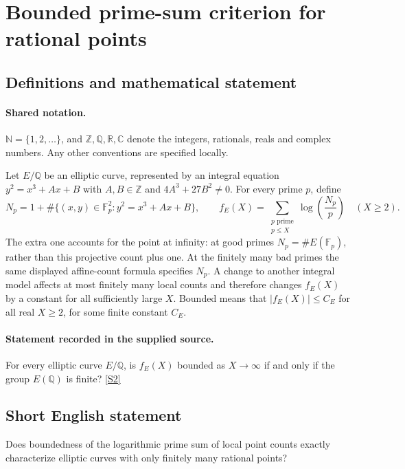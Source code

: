 \documentclass[11pt]{article}
\newcommand{\sref}[2]{\hyperlink{source:#1:#2}{[S#2]}}
\begin{document}
\section{Bounded prime-sum criterion for rational points}\label{statement}

\subsection{Definitions and mathematical statement}

\paragraph{Shared notation.}$\mathbb N=\{1,2,\ldots\}$, and $\mathbb Z,\mathbb Q,\mathbb R,\mathbb C$ denote the integers, rationals, reals and complex numbers. Any other conventions are specified locally.


Let $E/\mathbb Q$ be an elliptic curve, represented by an integral equation $y^2=x^3+Ax+B$ with $A,B\in\mathbb Z$ and $4A^3+27B^2\ne0$. For every prime $p$, define
\[
N_p=1+\#\{(x,y)\in\mathbb F_p^2:y^2=x^3+Ax+B\},\qquad
f_E(X)=\sum_{\substack{p\text{ prime}\\p\le X}}\log\!\left(\frac{N_p}{p}\right)\quad(X\ge2).
\]
The extra one accounts for the point at infinity: at good primes $N_p=\#E(\mathbb F_p)$, rather than this projective count plus one. At the finitely many bad primes the same displayed affine-count formula specifies $N_p$. A change to another integral model affects at most finitely many local counts and therefore changes $f_E(X)$ by a constant for all sufficiently large $X$. Bounded means that $|f_E(X)|\le C_E$ for all real $X\ge2$, for some finite constant $C_E$.
\paragraph{Statement recorded in the supplied source.}
For every elliptic curve $E/\mathbb Q$, is $f_E(X)$ bounded as $X\to\infty$ if and only if the group $E(\mathbb Q)$ is finite? \sref{statement}{2}
\subsection{Short English statement}
Does boundedness of the logarithmic prime sum of local point counts exactly characterize elliptic curves with only finitely many rational points?
\end{document}
